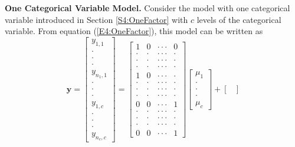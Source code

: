 \textbf{One Categorical Variable Model.} Consider the model with one
categorical variable introduced in Section \ref{S4:OneFactor} with
$c$ levels of the categorical variable. From equation
(\ref{E4:OneFactor}), this model can be written as
\begin{equation}\label{E4:MatrixOneFactor}
\mathbf{y}=
\begin{bmatrix}
y_{1,1} \\
\cdot  \\
\cdot  \\
\cdot  \\
y_{n_1,1} \\
\cdot  \\
\cdot  \\
\cdot  \\
y_{1,c} \\
\cdot  \\
\cdot  \\
\cdot  \\
y_{n_{c},c}%
\end{bmatrix}
=
\begin{bmatrix}
1 & 0 & \cdot \cdot \cdot  & 0 \\
\cdot  & \cdot  & \cdot \cdot \cdot  & \cdot  \\
\cdot  & \cdot  & \cdot \cdot \cdot  & \cdot  \\
\cdot  & \cdot  & \cdot \cdot \cdot  & \cdot  \\
1 & 0 & \cdot \cdot \cdot  & \cdot  \\
\cdot  & \cdot  & \cdot \cdot \cdot  & \cdot  \\
\cdot  & \cdot  & \cdot \cdot \cdot  & \cdot  \\
\cdot  & \cdot  & \cdot \cdot \cdot  & \cdot  \\
0 & 0 & \cdot \cdot \cdot  & 1 \\
\cdot  & \cdot  & \cdot \cdot \cdot  & \cdot  \\
\cdot  & \cdot  & \cdot \cdot \cdot  & \cdot  \\
\cdot  & \cdot  & \cdot \cdot \cdot  & \cdot  \\
0 & 0 & \cdot \cdot \cdot  & 1%
\end{bmatrix}%
\begin{bmatrix}
\mu_1 \\
\cdot  \\
\cdot  \\
\cdot  \\
\mu_c
\end{bmatrix}
+
\begin{bmatrix}

\end{bmatrix}
\end{equation}
